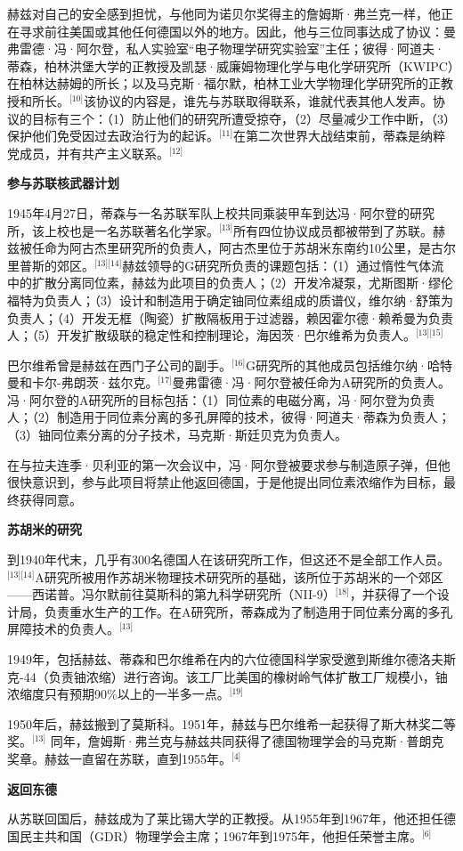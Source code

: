 赫兹对自己的安全感到担忧，与他同为诺贝尔奖得主的詹姆斯·弗兰克一样，他正在寻求前往美国或其他任何德国以外的地方。因此，他与三位同事达成了协议：曼弗雷德·冯·阿尔登，私人实验室“电子物理学研究实验室”主任；彼得·阿道夫·蒂森，柏林洪堡大学的正教授及凯瑟·威廉姆物理化学与电化学研究所（KWIPC）在柏林达赫姆的所长；以及马克斯·福尔默，柏林工业大学物理化学研究所的正教授和所长。\(^\text{[10]}\)该协议的内容是，谁先与苏联取得联系，谁就代表其他人发声。协议的目标有三个：（1）防止他们的研究所遭受掠夺，（2）尽量减少工作中断，（3）保护他们免受因过去政治行为的起诉。\(^\text{[11]}\)在第二次世界大战结束前，蒂森是纳粹党成员，并有共产主义联系。\(^\text{[12]}\)

\textbf{参与苏联核武器计划}

1945年4月27日，蒂森与一名苏联军队上校共同乘装甲车到达冯·阿尔登的研究所，该上校也是一名苏联著名化学家。\(^\text{[13]}\)所有四位协议成员都被带到了苏联。赫兹被任命为阿古杰里研究所的负责人，阿古杰里位于苏胡米东南约10公里，是古尔里普斯的郊区。\(^\text{[13][14]}\)赫兹领导的G研究所负责的课题包括：（1）通过惰性气体流中的扩散分离同位素，赫兹为此项目的负责人；（2）开发冷凝泵，尤斯图斯·缪伦福特为负责人；（3）设计和制造用于确定铀同位素组成的质谱仪，维尔纳·舒策为负责人；（4）开发无框（陶瓷）扩散隔板用于过滤器，赖因霍尔德·赖希曼为负责人；（5）开发扩散级联的稳定性和控制理论，海因茨·巴尔维希为负责人。\(^\text{[13][15]}\)

巴尔维希曾是赫兹在西门子公司的副手。\(^\text{[16]}\)G研究所的其他成员包括维尔纳·哈特曼和卡尔-弗朗茨·兹尔克。\(^\text{[17]}\)曼弗雷德·冯·阿尔登被任命为A研究所的负责人。冯·阿尔登的A研究所的目标包括：（1）同位素的电磁分离，冯·阿尔登为负责人；（2）制造用于同位素分离的多孔屏障的技术，彼得·阿道夫·蒂森为负责人；（3）铀同位素分离的分子技术，马克斯·斯廷贝克为负责人。

在与拉夫连季·贝利亚的第一次会议中，冯·阿尔登被要求参与制造原子弹，但他很快意识到，参与此项目将禁止他返回德国，于是他提出同位素浓缩作为目标，最终获得同意。

\textbf{苏胡米的研究}

到1940年代末，几乎有300名德国人在该研究所工作，但这还不是全部工作人员。\(^\text{[13][14]}\)A研究所被用作苏胡米物理技术研究所的基础，该所位于苏胡米的一个郊区——西诺普。冯尔默前往莫斯科的第九科学研究所（NII-9）\(^\text{[18]}\)，并获得了一个设计局，负责重水生产的工作。在A研究所，蒂森成为了制造用于同位素分离的多孔屏障技术的负责人。\(^\text{[13]}\)

1949年，包括赫兹、蒂森和巴尔维希在内的六位德国科学家受邀到斯维尔德洛夫斯克-44（负责铀浓缩）进行咨询。该工厂比美国的橡树岭气体扩散工厂规模小，铀浓缩度只有预期90\%以上的一半多一点。\(^\text{[19]}\)

1950年后，赫兹搬到了莫斯科。1951年，赫兹与巴尔维希一起获得了斯大林奖二等奖。\(^\text{[13]}\) 同年，詹姆斯·弗兰克与赫兹共同获得了德国物理学会的马克斯·普朗克奖章。赫兹一直留在苏联，直到1955年。\(^\text{[4]}\)

\textbf{返回东德}

从苏联回国后，赫兹成为了莱比锡大学的正教授。从1955年到1967年，他还担任德国民主共和国（GDR）物理学会主席；1967年到1975年，他担任荣誉主席。\(^\text{[6]}\)
